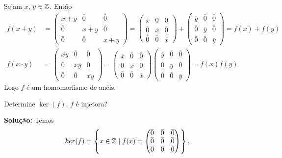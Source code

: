 \documentclass[12pt]{article}
\begin{document}
Sejam $x$, $y \in \mathbb{Z}$. Então
\begin{align*}
	f(x + y) &= \begin{pmatrix}
		\overline{x + y} & \overline{0} & \overline{0}\\
		\overline{0} & \overline{x + y} & \overline{0}\\
		\overline{0} & \overline{0} & \overline{x + y}
	\end{pmatrix} = \begin{pmatrix}
		\overline{x} & \overline{0} & \overline{0}\\
		\overline{0} & \overline{x} & \overline{0}\\
		\overline{0} & \overline{0} & \overline{x}
	\end{pmatrix} + \begin{pmatrix}
		\overline{y} & \overline{0} & \overline{0}\\
		\overline{0} & \overline{y} & \overline{0}\\
		\overline{0} & \overline{0} & \overline{y}
	\end{pmatrix} = f(x) + f(y)\\
	f(x\cdot y) &= \begin{pmatrix}
		\overline{xy} & \overline{0} & \overline{0}\\
		\overline{0} & \overline{xy} & \overline{0}\\
		\overline{0} & \overline{0} & \overline{xy}
	\end{pmatrix} = \begin{pmatrix}
		\overline{x} & \overline{0} & \overline{0}\\
		\overline{0} & \overline{x} & \overline{0}\\
		\overline{0} & \overline{0} & \overline{x}
	\end{pmatrix} \begin{pmatrix}
		\overline{y} & \overline{0} & \overline{0}\\
		\overline{0} & \overline{y} & \overline{0}\\
		\overline{0} & \overline{0} & \overline{y}
	\end{pmatrix} = f(x)f(y)
\end{align*}
Logo $f$ é um homomorfismo de anéis.

\vspace{1cm}

\questao Determine $\ker(f)$. $f$ é injetora?

\noindent\textbf{Solu\c{c}\~ao:} Temos
\[
	ker(f) = \left\{x \in \mathbb{Z} \mid f(x) = \begin{pmatrix}
		\overline{0} & \overline{0} & \overline{0}\\
		\overline{0} & \overline{0} & \overline{0}\\
		\overline{0} & \overline{0} & \overline{0}
	\end{pmatrix}\right\}.
\]
\end{document}
